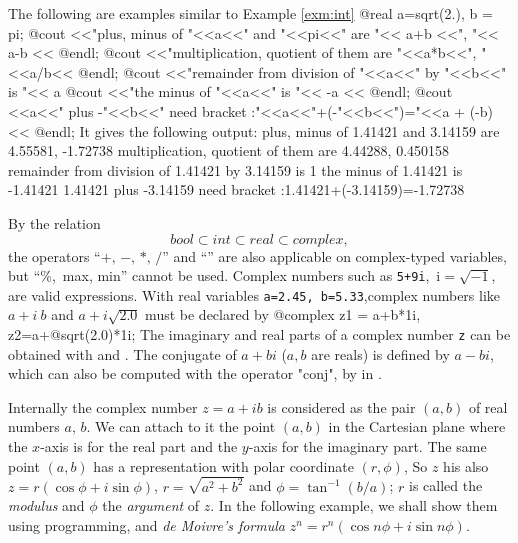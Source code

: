 \documentclass[a4paper,twoside,12pt]{book}
\def\key#1{\emph{#1}\index{#1}}
\begin{document}
The following are examples similar to Example \ref{exm:int}
\bFF
@real a=sqrt(2.), b = pi;
@cout <<"plus, minus of "<<a<<" and "<<pi<<" are "<< a+b <<", "<< a-b << @endl;
@cout <<"multiplication, quotient of them are "<<a*b<<", "<<a/b<< @endl;
@cout <<"remainder from division of "<<a<<" by "<<b<<" is "<< a%
@cout <<"the minus of "<<a<<" is "<< -a << @endl;
@cout <<a<<" plus -"<<b<<" need bracket :"<<a<<"+(-"<<b<<")="<<a + (-b) << @endl;
\eFF
It gives the following output:
\bFF
plus, minus of 1.41421 and 3.14159 are 4.55581, -1.72738
multiplication, quotient of them are 4.44288, 0.450158
remainder from division of 1.41421 by 3.14159 is 1
the minus of 1.41421 is -1.41421
1.41421 plus -3.14159 need bracket :1.41421+(-3.14159)=-1.72738
\eFF

By the relation
$$
bool\subset int \subset real\subset complex,
$$
the operators
``$+,\, -,\, *,\, /$'' and ``\ttCC{\^}'' are also applicable on complex-typed variables,
but ``\%,\, max, min'' cannot be used.
Complex numbers such as \texttt{5+9i},\, i$=\sqrt{-1}$, are valid expressions.
With real variables \texttt{a=2.45, b=5.33},complex numbers like
$a+i~b$ and $a+i\sqrt{2.0}$ must be declared by
\bFF
@complex z1 = a+b*1i, z2=a+@sqrt(2.0)*1i;
\eFF
The imaginary and real parts of a complex number \texttt{z} can be  obtained with
 and . 
The conjugate of $a+bi$ ($a,b$ are reals) is defined by $a-bi$, which
can also be computed with the operator "conj",  by  in \freefempp.

Internally the complex number $z=a+ib$ is considered as
the pair $(a,b)$ of real numbers $a,\, b$.
We can attach to it the point $(a,b)$ in the Cartesian plane where the $x$-axis is for the
 real part and the
$y$-axis for the imaginary part.
The same point $(a,b)$ has a representation with polar coordinate $(r,\phi)$,
So $z$ his also $z=r(\cos \phi+i\sin\phi )$,
$r=\sqrt{a^2+b^2}$ and $\phi=\tan^{-1}(b/a)$;
$r$ is called the \key{modulus} and $\phi$ the \key{argument} of $z$.
In the following example, we shall show them using \freefempp programming,
and \key{de Moivre's formula} $z^n=r^n(\cos n\phi+i\sin n\phi)$.
\end{document}
